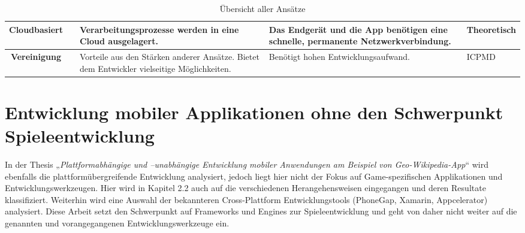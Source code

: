 \begin{table}[htbp]
{\begin{tabular}{|c|c|p{5cm}|p{5cm}|p{1cm}|}
			\textbf{Cloudbasiert}                 &                                             & Verarbeitungsprozesse werden in eine Cloud ausgelagert.                                                                                                                                                                                                                                                                          & Das Endgerät und die App benötigen eine schnelle, permanente Netzwerkverbindung.                                                                                                                       & Theoretisch                                                                                                                                         \\ \hline
			\textbf{Vereinigung}                   &                                             & Vorteile aus den Stärken anderer Ansätze. Bietet dem Entwickler vielseitige Möglichkeiten.                                                                                                                                                                                                                                       & Benötigt hohen Entwicklungsaufwand.                                                                                                                                                                    & ICPMD                                                                                                                                               \\ \hline
		\end{tabular}
	}
	\caption{Übersicht aller Ansätze}
	\label{table_all_approaches}
\end{table}

\section{Entwicklung mobiler Applikationen ohne den Schwerpunkt Spieleentwicklung}
In der Thesis „\textit{Plattformabhängige und –unabhängige Entwicklung mobiler Anwendungen am Beispiel von Geo-Wikipedia-App}“ \citep{cross_plattform_development_vehse} wird ebenfalls die plattformübergreifende Entwicklung analysiert, jedoch liegt hier nicht der Fokus auf Game-spezifischen Applikationen und Entwicklungswerkzeugen. Hier wird in Kapitel 2.2 auch auf die verschiedenen Herangehensweisen eingegangen und deren Resultate klassifiziert. Weiterhin wird eine Auswahl der bekannteren Cross-Plattform Entwicklungstools (PhoneGap, Xamarin, Appcelerator) analysiert. Diese Arbeit setzt den Schwerpunkt auf Frameworks und Engines zur Spieleentwicklung und geht von daher nicht weiter auf die genannten und vorangegangenen Entwicklungswerkzeuge ein.

